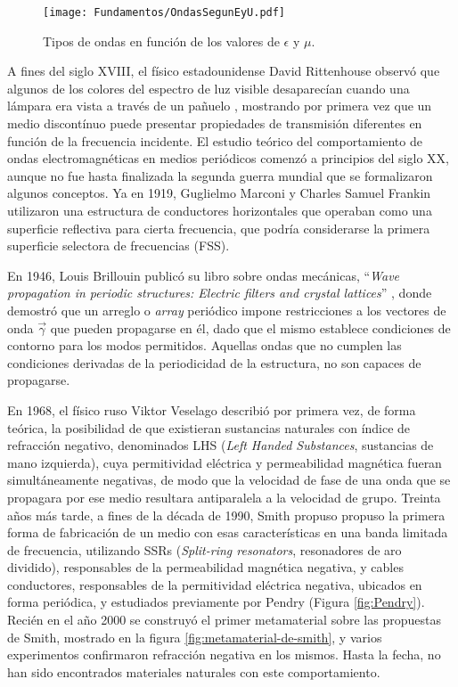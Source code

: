 \begin{figure}[htp]
	\centering
	\texttt{[image: Fundamentos/OndasSegunEyU.pdf]}
	\caption{Tipos de ondas en función de los valores de $\epsilon$ y $\mu$.}
	\label{fig:tablamuepsilon}
\end{figure}


A fines del siglo XVIII, el físico estadounidense David Rittenhouse observó que algunos de los colores del espectro de luz visible desaparecían cuando una lámpara era vista a través de un pañuelo \cite{Rittenhouse:OpticalProblem}, mostrando por primera vez que un medio discontínuo puede presentar propiedades de transmisión diferentes en función de la frecuencia incidente. El estudio teórico del comportamiento de ondas electromagnéticas en medios periódicos comenzó a principios del siglo XX, aunque no fue hasta finalizada la segunda guerra mundial que se formalizaron algunos conceptos. Ya en 1919, Guglielmo Marconi y Charles Samuel Frankin utilizaron una estructura de conductores horizontales que operaban como una superficie reflectiva para cierta frecuencia, que podría considerarse la primera superficie selectora de frecuencias (FSS).

En 1946, Louis Brillouin publicó su libro sobre ondas mecánicas, \enquote{\textit{Wave propagation in periodic structures: Electric filters and crystal lattices}} \cite{Brillouin:WavePropagation}, donde demostró que un arreglo o \textit{array} periódico impone restricciones a los vectores de onda $\vec{\gamma}$ que pueden propagarse en él, dado que el mismo establece condiciones de contorno para los modos permitidos. Aquellas ondas que no cumplen las condiciones derivadas de la periodicidad de la estructura, no son capaces de propagarse.

En 1968, el físico ruso Viktor Veselago describió por primera vez, de forma teórica, la posibilidad de que existieran sustancias naturales con índice de refracción negativo, denominados LHS (\textit{Left Handed Substances}, sustancias de mano izquierda), cuya permitividad eléctrica y permeabilidad magnética fueran simultáneamente negativas, de modo que la velocidad de fase de una onda que se propagara por ese medio resultara antiparalela a la velocidad de grupo. Treinta años más tarde, a fines de la década de 1990, Smith propuso propuso la primera forma de fabricación de un medio con esas características en una banda limitada de frecuencia, utilizando SSRs (\textit{Split-ring resonators}, resonadores de aro dividido), responsables de la permeabilidad magnética negativa, y cables conductores, responsables de la permitividad eléctrica negativa, ubicados en forma periódica, y estudiados previamente por Pendry (Figura \ref{fig:Pendry}). Recién en el año 2000 se construyó el primer metamaterial sobre las propuestas de Smith, mostrado en la figura \ref{fig:metamaterial-de-smith}, y varios experimentos confirmaron refracción negativa en los mismos. Hasta la fecha, no han sido encontrados materiales naturales con este comportamiento.

